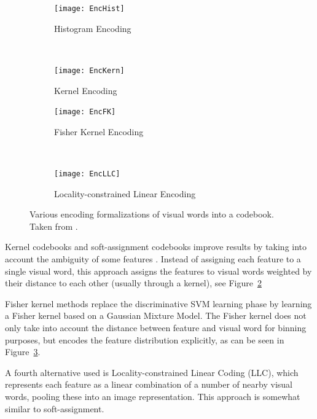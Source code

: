 \begin{figure}
    \centering
    \begin{subfigure}[b]{0.45\textwidth}
        \centering
        \texttt{[image: EncHist]}
        \caption{Histogram Encoding}
        \label{fig:enchist}
    \end{subfigure}
    ~
    \begin{subfigure}[b]{0.45\textwidth}
        \centering
        \texttt{[image: EncKern]}
        \caption{Kernel Encoding}
        \label{fig:enckern}
    \end{subfigure}
    
    \begin{subfigure}[b]{0.45\textwidth}
        \centering
        \texttt{[image: EncFK]}
        \caption{Fisher Kernel Encoding}
        \label{fig:encfk}
    \end{subfigure}
    ~
    \begin{subfigure}[b]{0.45\textwidth}
        \centering
        \texttt{[image: EncLLC]}
        \caption{Locality-constrained Linear Encoding}
        \label{fig:encllc}
    \end{subfigure}
    
    \caption{Various encoding formalizations of visual words into a codebook. Taken from \cite{chatfield2011devil}.}
    \label{fig:bowencoding}
\end{figure}

Kernel codebooks and soft-assignment codebooks improve results by taking into account the ambiguity of some features \cite{liu2011defense, van2010visual}. Instead of assigning each feature to a single visual word, this approach assigns the features to visual words weighted by their distance to each other (usually through a kernel), see Figure~\ref{fig:enckern}

Fisher kernel methods \cite{perronnin2010improving} replace the discriminative SVM learning phase by learning a Fisher kernel based on a Gaussian Mixture Model. The Fisher kernel does not only take into account the distance between feature and visual word for binning purposes, but encodes the feature distribution explicitly, as can be seen in Figure~\ref{fig:encfk}.

A fourth alternative used is Locality-constrained Linear Coding (LLC), \cite{wang2010locality} which represents each feature as a linear combination of a number of nearby visual words, pooling these into an image representation. This approach is somewhat similar to soft-assignment.\\

